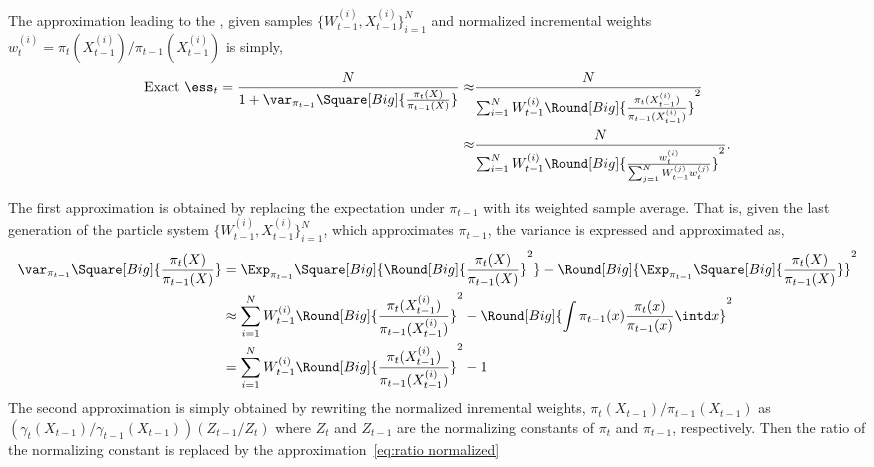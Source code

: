 The approximation leading to the \cess, given samples $\{W_{t-1}^{(i)},X_{t-1}^{(i)}\}_{i=1}^N$ and normalized incremental weights $w_{t}^{(i)} = \pi_t(X_{t-1}^{(i)})/\pi_{t-1}(X_{t-1}^{(i)})$ is simply,
\begin{align*}
  \text{Exact }\ess_t = \frac{N}{1 + \var_{\pi_{t-1}}
    \Square[Big]{\frac{\pi_t(X)}{\pi_{t-1}(X)}}}
  \approx& \frac{N}{\sum_{i=1}^N W_{t-1}^{(i)} 
    \Round[Big]{\frac{\pi_t(X_{t-1}^{(i)})}{\pi_{t-1}(X_{t-1}^{(i)})}}^2}\\
  \approx& \frac{N}{\sum_{i=1}^N W_{t-1}^{(i)}
    \Round[Big]{\frac{w_t^{(i)}}{\sum_{j=1}^N W_{t-1}^{(j)} w_t^{(j)}}}^2}.
\end{align*}
\begin{draftpar}
The first approximation is obtained by replacing the expectation under $\pi_{t-1}$ with its weighted sample average. That is, given the last generation of the particle system $\{W_{t-1}^{(i)}, X_{t-1}^{(i)}\}_{i=1}^N$, which approximates $\pi_{t-1}$, the variance is expressed and approximated as,
\begin{align*}
  \var_{\pi_{t-1}}\Square[Big]{\frac{\pi_t(X)}{\pi_{t-1}(X)}}
  &= \Exp_{\pi_{t-1}}\Square[Big]{\Round[Big]{\frac{\pi_t(X)}{\pi_{t-1}(X)}}^2} -
  \Round[Big]{\Exp_{\pi_{t-1}}\Square[Big]{\frac{\pi_t(X)}{\pi_{t-1}(X)}}}^2 \\
  &\approx \sum_{i=1}^N W_{t-1}^{(i)} \Round[Big]{\frac{\pi_t(X_{t-1}^{(i)})}{\pi_{t-1}(X_{t-1}^{(i)})}}^2
  - \Round[Big]{\int \pi_{t-1}(x)\frac{\pi_t(x)}{\pi_{t-1}(x)}\intd x}^2 \\
  &= \sum_{i=1}^N W_{t-1}^{(i)} \Round[Big]{\frac{\pi_t(X_{t-1}^{(i)})}{\pi_{t-1}(X_{t-1}^{(i)})}}^2 - 1
\end{align*}
The second approximation is simply obtained by rewriting the normalized inremental weights, $\pi_t(X_{t-1})/\pi_{t-1}(X_{t-1})$ as $(\gamma_t(X_{t-1})/\gamma_{t-1}(X_{t-1}))(Z_{t-1}/Z_t)$ where $Z_t$ and $Z_{t-1}$ are the normalizing constants of $\pi_t$ and $\pi_{t-1}$, respectively. Then the ratio of the normalizing constant is replaced by the approximation~\ref{eq:ratio normalized}
\end{draftpar}

